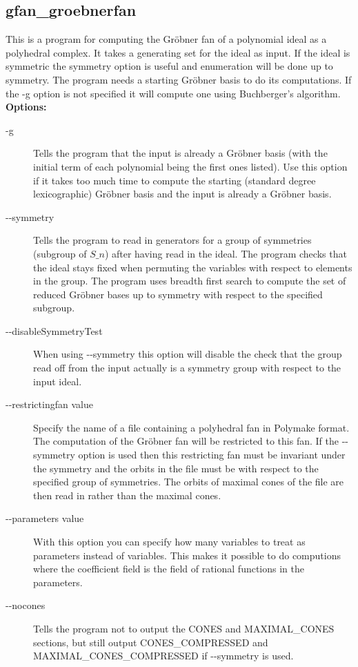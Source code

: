 {{{{{{{{{{{{{{{{\subsection{gfan\_groebnerfan}\label{applist:_groebnerfan}
This is a program for computing the Gr\"obner fan of a polynomial ideal as a polyhedral complex. It takes a generating set for the ideal as input. If the ideal is symmetric the symmetry option is useful and enumeration will be done up to symmetry. The program needs a starting Gr\"obner basis to do its computations. If the -g option is not specified it will compute one using Buchberger's algorithm.
\newline
{\bf Options:}
\begin{description}
\item[-g]Tells the program that the input is already a Gr\"obner basis (with the initial term of each polynomial being the first ones listed). Use this option if it takes too much time to compute the starting (standard degree lexicographic) Gr\"obner basis and the input is already a Gr\"obner basis.
\item[-\hspace{0.013cm}-symmetry]Tells the program to read in generators for a group of symmetries (subgroup of $S\_n$) after having read in the ideal. The program checks that the ideal stays fixed when permuting the variables with respect to elements in the group. The program uses breadth first search to compute the set of reduced Gr\"obner bases up to symmetry with respect to the specified subgroup.
\item[-\hspace{0.013cm}-disableSymmetryTest]When using -\hspace{0.013cm}-symmetry this option will disable the check that the group read off from the input actually is a symmetry group with respect to the input ideal.
\item[-\hspace{0.013cm}-restrictingfan value]Specify the name of a file containing a polyhedral fan in Polymake format. The computation of the Gr\"obner fan will be restricted to this fan. If the -\hspace{0.013cm}-symmetry option is used then this restricting fan must be invariant under the symmetry and the orbits in the file must be with respect to the specified group of symmetries. The orbits of maximal cones of the file are then read in rather than the maximal cones.
\item[-\hspace{0.013cm}-parameters value]With this option you can specify how many variables to treat as parameters instead of variables. This makes it possible to do computions where the coefficient field is the field of rational functions in the parameters.\item[-\hspace{0.013cm}-nocones]Tells the program not to output the CONES and MAXIMAL\_CONES sections, but still output CONES\_COMPRESSED and MAXIMAL\_CONES\_COMPRESSED if -\hspace{0.013cm}-symmetry is used.\end{description}


}}}}}}}}}}}}}}}}
